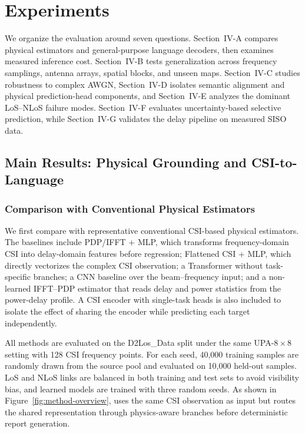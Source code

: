 \section{Experiments}

We organize the evaluation around seven questions. Section~IV-A compares physical estimators and
general-purpose language decoders, then examines measured inference cost. Section~IV-B tests
generalization across frequency samplings, antenna arrays, spatial blocks, and unseen maps.
Section~IV-C studies robustness to complex AWGN, Section~IV-D isolates semantic alignment and physical
prediction-head components, and Section~IV-E analyzes the dominant LoS--NLoS failure modes.
Section~IV-F evaluates uncertainty-based selective prediction, while Section~IV-G validates the delay
pipeline on measured SISO data.

\subsection{Main Results: Physical Grounding and CSI-to-Language}

\subsubsection{Comparison with Conventional Physical Estimators}

We first compare \model{} with representative conventional CSI-based physical estimators. The
baselines include PDP/IFFT + MLP, which transforms frequency-domain CSI into delay-domain features
before regression; Flattened CSI + MLP, which directly vectorizes the complex CSI observation; a
Transformer without task-specific branches; a CNN baseline over the beam--frequency input; and a
non-learned IFFT--PDP estimator that reads delay and power statistics from the power-delay profile.
A CSI encoder with single-task heads is also included to isolate the effect of sharing the encoder
while predicting each target independently.

All methods are evaluated on the D2Los\_Data split under the same UPA-$8{\times}8$ setting with
128 CSI frequency points. For each seed, 40,000 training samples are randomly drawn from the source
pool and evaluated on 10,000 held-out samples. LoS and NLoS links are balanced in both training and
test sets to avoid visibility bias, and learned models are trained with three random seeds. As shown
in Figure~\ref{fig:method-overview}, \model{} uses the same CSI observation as input but routes the
shared representation through physics-aware branches before deterministic report generation.

